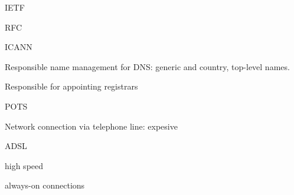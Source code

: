 \documentclass[main.tex]{subfiles}
\begin{document}
\small

\layer{}

\begin{card}{IETF}
\TODO
\end{card}

\begin{card}{RFC}
\TODO
\end{card}

\begin{card}{ICANN}
\item Responsible name management for DNS: generic and country, top-level names.
\item Responsible for appointing registrars
\end{card}

\begin{card}{POTS}
\item Network connection via telephone line: expesive
\end{card}

\begin{card}{ADSL}
\item high speed
\item always-on connections
\end{card}
\end{document}
